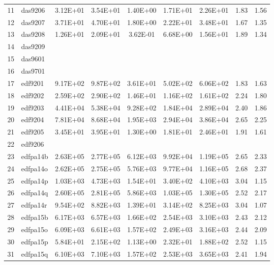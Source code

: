 \begin{landscape}
\begin{longtable}{@{}ll*{7}{S}@{}}
11 & das9206   & 3.12E+01 & 3.54E+01 & 1.40E+00 & 1.71E+01 & 2.26E+01 & 1.83 & 1.56 \\
12 & das9207   & 3.71E+01 & 4.70E+01 & 1.80E+00 & 2.22E+01 & 3.48E+01 & 1.67 & 1.35 \\
13 & das9208   & 1.26E+01 & 2.09E+01 & 3.62E-01 & 6.68E+00 & 1.56E+01 & 1.89 & 1.34 \\
14 & das9209   &         &         &         &         &         &     &     \\
15 & das9601   &         &         &         &         &         &     &     \\
16 & das9701   &         &         &         &         &         &     &     \\
17 & edf9201   & 9.17E+02 & 9.87E+02 & 3.61E+01 & 5.02E+02 & 6.06E+02 & 1.83 & 1.63 \\
18 & edf9202   & 2.59E+02 & 2.90E+02 & 1.46E+01 & 1.16E+02 & 1.61E+02 & 2.24 & 1.80 \\
19 & edf9203   & 4.41E+04 & 5.38E+04 & 9.28E+02 & 1.84E+04 & 2.89E+04 & 2.40 & 1.86 \\
20 & edf9204   & 7.81E+04 & 8.68E+04 & 1.95E+03 & 2.94E+04 & 3.86E+04 & 2.65 & 2.25 \\
21 & edf9205   & 3.45E+01 & 3.95E+01 & 1.30E+00 & 1.81E+01 & 2.46E+01 & 1.91 & 1.61 \\
22 & edf9206   &         &         &         &         &         &     &     \\
23 & edfpa14b  & 2.63E+05 & 2.77E+05 & 6.12E+03 & 9.92E+04 & 1.19E+05 & 2.65 & 2.33 \\
24 & edfpa14o  & 2.62E+05 & 2.75E+05 & 5.76E+03 & 9.77E+04 & 1.16E+05 & 2.68 & 2.37 \\
25 & edfpa14p  & 1.03E+03 & 4.73E+03 & 1.54E+01 & 3.40E+02 & 4.10E+03 & 3.04 & 1.15 \\
26 & edfpa14q  & 2.60E+05 & 2.81E+05 & 5.86E+03 & 1.03E+05 & 1.30E+05 & 2.52 & 2.17 \\
27 & edfpa14r  & 9.54E+02 & 8.82E+03 & 1.39E+01 & 3.14E+02 & 8.25E+03 & 3.04 & 1.07 \\
28 & edfpa15b  & 6.17E+03 & 6.57E+03 & 1.66E+02 & 2.54E+03 & 3.10E+03 & 2.43 & 2.12 \\
29 & edfpa15o  & 6.09E+03 & 6.61E+03 & 1.57E+02 & 2.49E+03 & 3.16E+03 & 2.44 & 2.09 \\
30 & edfpa15p  & 5.84E+01 & 2.15E+02 & 1.13E+00 & 2.32E+01 & 1.88E+02 & 2.52 & 1.15 \\
31 & edfpa15q  & 6.10E+03 & 7.10E+03 & 1.57E+02 & 2.53E+03 & 3.65E+03 & 2.41 & 1.94 \\

\end{longtable}
\end{landscape}
